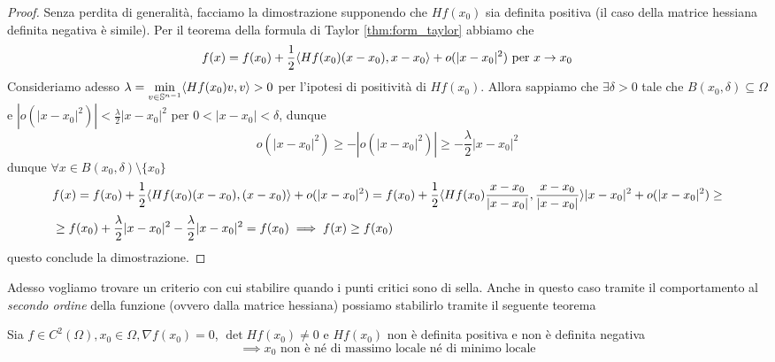 \documentclass[openany, italian]{book}
\begin{document}
\begin{proof} Senza perdita di generalità, facciamo la dimostrazione supponendo che $Hf(x_0)$ sia definita positiva (il caso della matrice hessiana definita negativa è simile). 
Per il teorema della formula di Taylor \ref{thm:form_taylor} abbiamo che
$$
f(x) = f(x_0) + \frac{1}{2} \langle Hf(x_0)(x-x_0), x-x_0 \rangle + o(|x-x_0|^2) \text{ per } x \to x_0
$$
Consideriamo adesso $\lambda = \min\limits_{v \in \mathbb{S}^{n-1}} \langle Hf(x_0)v, v \rangle > 0$ per l'ipotesi di positività di $Hf(x_0)$. Allora sappiamo che $\exists \delta > 0$ tale che $B(x_0, \delta) \subseteq \Omega$ e $|o(|x-x_0|^2)| < \frac{\lambda}{2}|x-x_0|^2$ per $0 < |x-x_0| < \delta$, dunque
$$
o(|x-x_0|^2) \geq -|o(|x-x_0|^2)| \geq -\frac{\lambda}{2}|x-x_0|^2
$$
dunque $\forall x \in B(x_0, \delta) \setminus \{ x_0 \}$
\begin{align*}
&f(x) = f(x_0) + \frac{1}{2}\langle Hf(x_0)(x-x_0), (x-x_0) \rangle + o(|x-x_0|^2) = f(x_0) + \frac{1}{2} \langle Hf(x_0)\frac{x-x_0}{|x-x_0|}, \frac{x-x_0}{|x-x_0|} \rangle|x-x_0|^2 + o(|x-x_0|^2) \geq \\
&\geq f(x_0) + \frac{\lambda}{2}|x-x_0|^2 - \frac{\lambda}{2}|x-x_0|^2 = f(x_0) \implies f(x) \geq f(x_0)
\end{align*}
questo conclude la dimostrazione.
\end{proof}
Adesso vogliamo trovare un criterio con cui stabilire quando i punti critici sono di sella. Anche in questo caso tramite il comportamento al \emph{secondo ordine} della funzione (ovvero dalla matrice hessiana) possiamo stabilirlo tramite il seguente teorema
\begin{theorem}
Sia $f \in C^2(\Omega), x_0 \in \Omega, \nabla f(x_0) = 0$, $\det{Hf(x_0)} \neq 0$ e $Hf(x_0)$ non è definita positiva e non è definita negativa
$$
\implies x_0 \text{ non è né di massimo locale né di minimo locale}
$$
\end{theorem}
\end{document}

